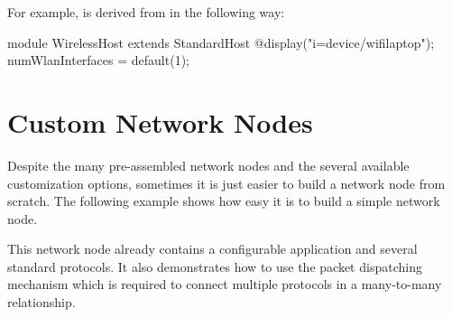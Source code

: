 For example,  is derived from 
in the following way:

\begin{ned}
module WirelessHost extends StandardHost
{
    @display("i=device/wifilaptop");
    numWlanInterfaces = default(1);
}
\end{ned}

\section{Custom Network Nodes}
\label{sec:nodes:custom-network-nodes}

Despite the many pre-assembled network nodes and the several available
customization options, sometimes it is just easier to build a network node
from scratch. The following example shows how easy it is to build a simple
network node.

This network node already contains a configurable application and several
standard protocols. It also demonstrates how to use the packet dispatching
mechanism which is required to connect multiple protocols in a many-to-many
relationship.





